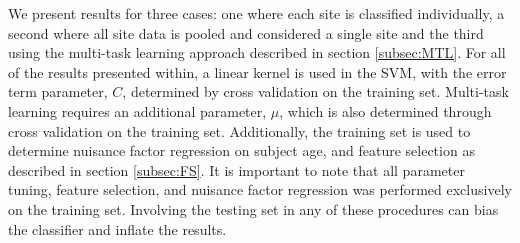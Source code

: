 \documentclass{llncs}
\begin{document}
We present results for three cases: one where each site is classified individually, a second where all site data is pooled and considered a single site and the third using the multi-task learning approach described in section \ref{subsec:MTL}. For all of the results presented within, a linear kernel is used in the SVM, with the error term parameter, $C$,  determined by cross validation on the training set. Multi-task learning requires an additional parameter, $\mu$, which is also determined through cross validation on the training set. Additionally, the training set is used to determine nuisance factor regression on subject age, and feature selection as described in section \ref{subsec:FS}. It is important to note that all parameter tuning, feature selection, and nuisance factor regression was performed exclusively on the training set. Involving the testing set in any of these procedures can bias the classifier and inflate the results.

\end{document}
